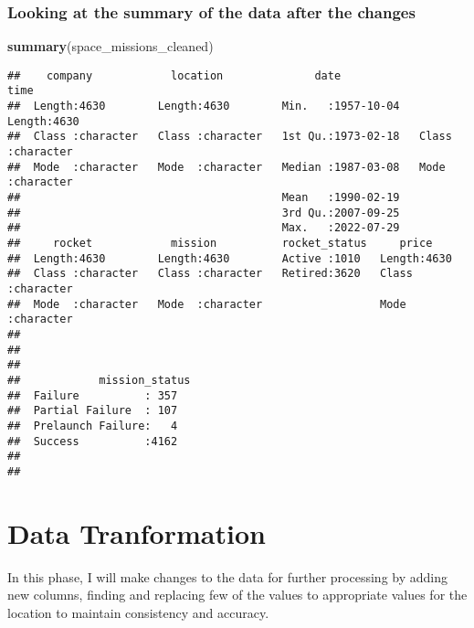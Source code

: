 \documentclass[
]{article}
\newenvironment{Shaded}{\begin{snugshade}}{\end{snugshade}}
\newcommand{\FunctionTok}[1]{\textcolor[rgb]{0.13,0.29,0.53}{\textbf{#1}}}
\newcommand{\NormalTok}[1]{#1}
\begin{document}
\hypertarget{looking-at-the-summary-of-the-data-after-the-changes}{%
\subsubsection{Looking at the summary of the data after the
changes}\label{looking-at-the-summary-of-the-data-after-the-changes}}

\begin{Shaded}
\begin{Highlighting}[]
\FunctionTok{summary}\NormalTok{(space\_missions\_cleaned)}
\end{Highlighting}
\end{Shaded}

\begin{verbatim}
##    company            location              date                time          
##  Length:4630        Length:4630        Min.   :1957-10-04   Length:4630       
##  Class :character   Class :character   1st Qu.:1973-02-18   Class :character  
##  Mode  :character   Mode  :character   Median :1987-03-08   Mode  :character  
##                                        Mean   :1990-02-19                     
##                                        3rd Qu.:2007-09-25                     
##                                        Max.   :2022-07-29                     
##     rocket            mission          rocket_status     price          
##  Length:4630        Length:4630        Active :1010   Length:4630       
##  Class :character   Class :character   Retired:3620   Class :character  
##  Mode  :character   Mode  :character                  Mode  :character  
##                                                                         
##                                                                         
##                                                                         
##            mission_status
##  Failure          : 357  
##  Partial Failure  : 107  
##  Prelaunch Failure:   4  
##  Success          :4162  
##                          
## 
\end{verbatim}

\hypertarget{data-tranformation}{%
\section{Data Tranformation}\label{data-tranformation}}

In this phase, I will make changes to the data for further processing by
adding new columns, finding and replacing few of the values to
appropriate values for the location to maintain consistency and
accuracy.
\end{document}
